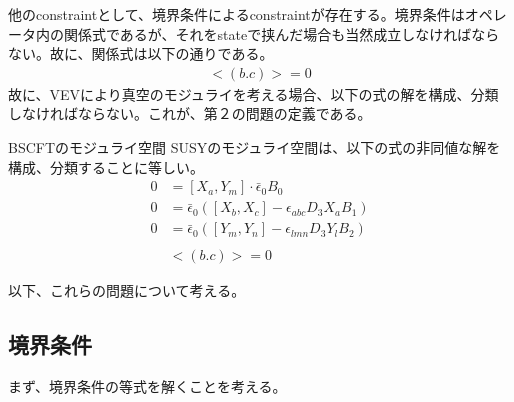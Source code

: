 \documentclass[dvipdfmx,a4paper,10.5pt]{article}
\numberwithin{equation}{section}
\begin{document}
他のconstraintとして、境界条件によるconstraintが存在する。境界条件はオペレータ内の関係式であるが、それをstateで挟んだ場合も当然成立しなければならない。故に、関係式は以下の通りである。
\begin{align*}
    <(b.c)>=0
\end{align*}
故に、VEVにより真空のモジュライを考える場合、以下の式の解を構成、分類しなければならない。これが、第２の問題の定義である。
\begin{defbox}{BSCFTのモジュライ空間}
    SUSYのモジュライ空間は、以下の式の非同値な解を構成、分類することに等しい。
    \begin{align*}
        0&=[X_{a},Y_{m}]\cdot\bar{\epsilon}_{0}B_{0}\\
    0&=\bar{\epsilon}_{0}([X_{b},X_{c}]-\epsilon_{abc}D_{3}X_{a}B_{1})\\
    0&=\bar{\epsilon}_{0}([Y_{m},Y_{n}]-\epsilon_{lmn}D_{3}Y_{l}B_{2})\\
    \\
    &<(b.c)>=0
    \end{align*}
\end{defbox}
以下、これらの問題について考える。
\subsection{境界条件}
まず、境界条件の等式を解くことを考える。
\end{document}
